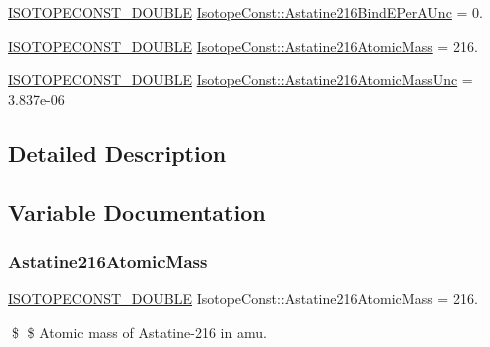 \begin{DoxyCompactItemize}
\mbox{\hyperlink{group___isotope_const-_macros_ga8f45a7272ce02c0b4c65c44636ed719a}{I\+S\+O\+T\+O\+P\+E\+C\+O\+N\+S\+T\+\_\+\+D\+O\+U\+B\+LE}} \mbox{\hyperlink{group___isotope_const-_astatine-_at216_ga8adc305c27e4cd38aec4f7f3cbb0f933}{Isotope\+Const\+::\+Astatine216\+Bind\+E\+Per\+A\+Unc}} = 0.
\item 
\mbox{\hyperlink{group___isotope_const-_macros_ga8f45a7272ce02c0b4c65c44636ed719a}{I\+S\+O\+T\+O\+P\+E\+C\+O\+N\+S\+T\+\_\+\+D\+O\+U\+B\+LE}} \mbox{\hyperlink{group___isotope_const-_astatine-_at216_ga07aaa6521464e25e498b2f5447538c83}{Isotope\+Const\+::\+Astatine216\+Atomic\+Mass}} = 216.
\item 
\mbox{\hyperlink{group___isotope_const-_macros_ga8f45a7272ce02c0b4c65c44636ed719a}{I\+S\+O\+T\+O\+P\+E\+C\+O\+N\+S\+T\+\_\+\+D\+O\+U\+B\+LE}} \mbox{\hyperlink{group___isotope_const-_astatine-_at216_ga0a2c4670f2de29ca6fdf66c491523912}{Isotope\+Const\+::\+Astatine216\+Atomic\+Mass\+Unc}} = 3.\+837e-\/06
\end{DoxyCompactItemize}


\subsection{Detailed Description}


\subsection{Variable Documentation}
\mbox{\label{group___isotope_const-_astatine-_at216_ga07aaa6521464e25e498b2f5447538c83}} 
\subsubsection{\texorpdfstring{Astatine216\+Atomic\+Mass}{Astatine216AtomicMass}}
{\footnotesize\ttfamily \mbox{\hyperlink{group___isotope_const-_macros_ga8f45a7272ce02c0b4c65c44636ed719a}{I\+S\+O\+T\+O\+P\+E\+C\+O\+N\+S\+T\+\_\+\+D\+O\+U\+B\+LE}} Isotope\+Const\+::\+Astatine216\+Atomic\+Mass = 216.}

\$ \$ Atomic mass of Astatine-\/216 in amu. \mbox{\label{group___isotope_const-_astatine-_at216_ga0a2c4670f2de29ca6fdf66c491523912}} 
